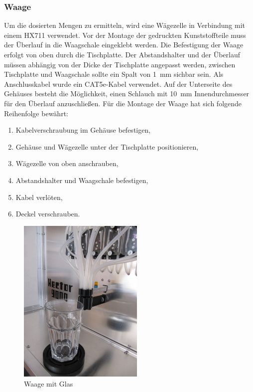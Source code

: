 \documentclass[a4paper]{scrartcl}
\begin{document}
\subsubsection{Waage}
Um die dosierten Mengen zu ermitteln, wird eine Wägezelle in Verbindung mit einem HX711 verwendet. Vor der Montage der gedruckten Kunststoffteile muss der Überlauf in die Waagschale eingeklebt werden. Die Befestigung der Waage erfolgt von oben durch die Tischplatte. Der Abstandshalter und der Überlauf müssen abhängig von der Dicke der Tischplatte angepasst werden, zwischen Tischplatte und Waagschale sollte ein Spalt von \SI{1}{\milli\metre} sichbar sein. Als Anschlusskabel wurde ein CAT5e-Kabel verwendet. Auf der Unterseite des Gehäuses besteht die Möglichkeit, einen Schlauch mit \SI{10}{\milli\metre} Innendurchmesser für den Überlauf anzuschließen. Für die Montage der Waage hat sich folgende Reihenfolge bewährt:

\begin{enumerate}
  \item Kabelverschraubung im Gehäuse befestigen,
  \item Gehäuse und Wägezelle unter der Tischplatte positionieren,
  \item Wägezelle von oben anschrauben,
  \item Abstandshalter und Waagschale befestigen,
  \item Kabel verlöten,
  \item Deckel verschrauben.
\end{enumerate}

\begin{figure}
  \centering
  \includegraphics[height=8cm]{pics/scale_glass.JPG}
  \caption{Waage mit Glas} \label{scale_glass}
\end{figure}
\end{document}
